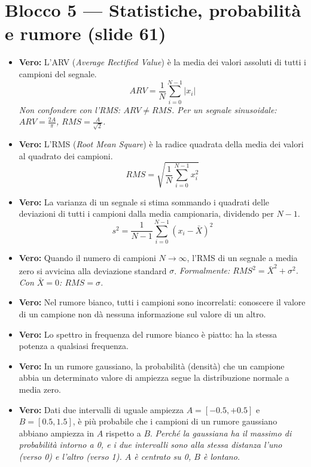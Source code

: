 \section{Blocco 5 — Statistiche, probabilità e rumore (slide 61)}

\begin{itemize}
    \item \textbf{Vero:} L'ARV (\textit{Average Rectified Value}) è la media dei valori assoluti di tutti i campioni del segnale.
    \[
    ARV = \frac{1}{N}\sum_{i=0}^{N-1}|x_i|
    \]
    \textit{Non confondere con l'RMS: $ARV \neq RMS$. Per un segnale sinusoidale: $ARV = \frac{2A}{\pi}$, $RMS = \frac{A}{\sqrt{2}}$.}
    
    \item \textbf{Vero:} L'RMS (\textit{Root Mean Square}) è la radice quadrata della media dei valori al quadrato dei campioni.
    \[
    RMS = \sqrt{\frac{1}{N}\sum_{i=0}^{N-1}x_i^2}
    \]
    
    \item \textbf{Vero:} La varianza di un segnale si stima sommando i quadrati delle deviazioni di tutti i campioni dalla media campionaria, dividendo per $N-1$.
    \[
    s^2 = \frac{1}{N-1}\sum_{i=0}^{N-1}(x_i - \bar{X})^2
    \]
    
    \item \textbf{Vero:} Quando il numero di campioni $N \to \infty$, l'RMS di un segnale a media zero si avvicina alla deviazione standard $\sigma$.
    \textit{Formalmente: $RMS^2 = \bar{X}^2 + \sigma^2$. Con $\bar{X}=0$: $RMS = \sigma$.}
    
    \item \textbf{Vero:} Nel rumore bianco, tutti i campioni sono incorrelati: conoscere il valore di un campione non dà nessuna informazione sul valore di un altro.
    
    \item \textbf{Vero:} Lo spettro in frequenza del rumore bianco è piatto: ha la stessa potenza a qualsiasi frequenza.
    
    \item \textbf{Vero:} In un rumore gaussiano, la probabilità (densità) che un campione abbia un determinato valore di ampiezza segue la distribuzione normale a media zero.
    
    \item \textbf{Vero:} Dati due intervalli di uguale ampiezza $A=[-0.5,+0.5]$ e $B=[0.5,1.5]$, è più probabile che i campioni di un rumore gaussiano abbiano ampiezza in $A$ rispetto a $B$.
    \textit{Perché la gaussiana ha il massimo di probabilità intorno a 0, e i due intervalli sono alla stessa distanza l'uno (verso 0) e l'altro (verso 1). $A$ è centrato su 0, $B$ è lontano.}
    

\end{itemize}
